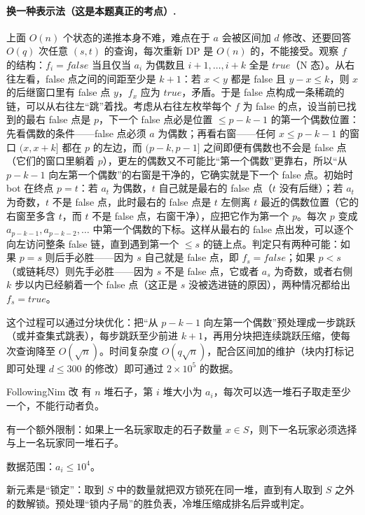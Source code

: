 \paragraph{换一种表示法（这是本题真正的考点）.} 上面 $O(n)$ 个状态的递推本身不难，难点在于 $a$ 会被区间加 $d$ 修改、还要回答 $O(q)$ 次任意 $(s,t)$ 的查询，每次重新 DP 是 $O(n)$ 的，不能接受。观察 $f$ 的结构：$f_i=false$ 当且仅当 $a_i$ 为偶数且 $i+1,\ldots,i+k$ 全是 $true$（N 态）。从右往左看，false 点之间的间距至少是 $k+1$：若 $x<y$ 都是 false 且 $y-x\le k$，则 $x$ 的后继窗口里有 false 点 $y$，$f_x$ 应为 $true$，矛盾。于是 false 点构成一条稀疏的链，可以从右往左“跳”着找。考虑从右往左枚举每个 $f$ 为 false 的点，设当前已找到的最右 false 点是 $p$，下一个 false 点必是位置 $\le p-k-1$ 的第一个偶数位置：先看偶数的条件——false 点必须 $a$ 为偶数；再看右窗——任何 $x\le p-k-1$ 的窗口 $(x,x+k]$ 都在 $p$ 的左边，而 $(p-k,p-1]$ 之间即便有偶数也不会是 false 点（它们的窗口里躺着 $p$），更左的偶数又不可能比“第一个偶数”更靠右，所以“从 $p-k-1$ 向左第一个偶数”的右窗是干净的，它确实就是下一个 false 点。初始时 bot 在终点 $p=t$：若 $a_t$ 为偶数，$t$ 自己就是最右的 false 点（$t$ 没有后继）；若 $a_t$ 为奇数，$t$ 不是 false 点，此时最右的 false 点是 $t$ 左侧离 $t$ 最近的偶数位置（它的右窗至多含 $t$，而 $t$ 不是 false 点，右窗干净），应把它作为第一个 $p$。每次 $p$ 变成 $a_{p-k-1},a_{p-k-2},\ldots$ 中第一个偶数的下标。这样从最右的 false 点出发，可以逐个向左访问整条 false 链，直到遇到第一个 $\le s$ 的链上点。判定只有两种可能：如果 $p=s$ 则后手必胜——因为 $s$ 自己就是 false 点，即 $f_s=false$；如果 $p<s$（或链耗尽）则先手必胜——因为 $s$ 不是 false 点，它或者 $a_s$ 为奇数，或者右侧 $k$ 步以内已经躺着一个 false 点（这正是 $s$ 没被选进链的原因），两种情况都给出 $f_s=true$。

\cost 这个过程可以通过分块优化：把“从 $p-k-1$ 向左第一个偶数”预处理成一步跳跃（或并查集式跳表），每步跳跃至少前进 $k+1$，再用分块把连续跳跃压缩，使每次查询降至 $O(\sqrt n)$。时间复杂度 $O(q\sqrt n)$，配合区间加的维护（块内打标记即可处理 $d\le300$ 的修改）即可通过 $2\times10^{5}$ 的数据。

\begin{problem}{FollowingNim 改}
有 $n$ 堆石子，第 $i$ 堆大小为 $a_i$，每次可以选一堆石子取走至少一个，不能行动者负。

有一个额外限制：如果上一名玩家取走的石子数量 $x\in S$，则下一名玩家必须选择与上一名玩家同一堆石子。

数据范围：$a_i\le10^{4}$。
\end{problem}

\hint 新元素是“锁定”：取到 $S$ 中的数量就把双方锁死在同一堆，直到有人取到 $S$ 之外的数解锁。预处理“锁内子局”的胜负表，冷堆压缩成排名后异或判定。

